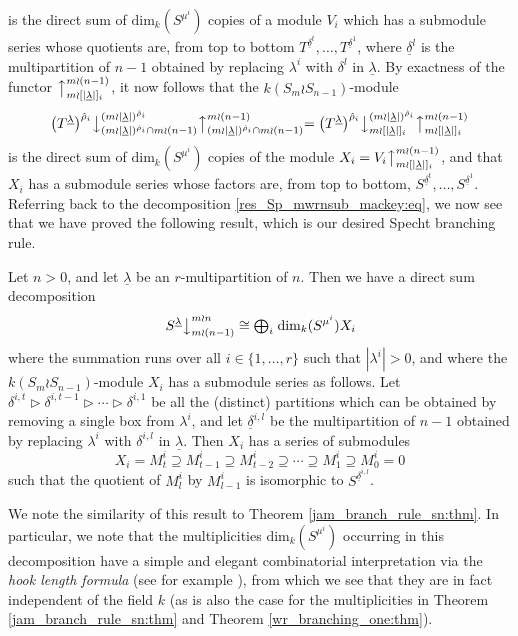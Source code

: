 \documentclass[ALCO,Unicode,published]{cedram}
\newcommand{\ul}[1]{\underline{#1}}
\begin{document}
is the direct sum of $\mathrm{dim}_k(S^{\mu^i})$ copies of a module $V_i$ which has a submodule series whose quotients are, from top to
bottom $T^{\ul{\delta}^t}, \ldots, T^{\ul{\delta}^1}$, where $\ul{\delta}^l$ is the multipartition of $n-1$ obtained by replacing $\lambda^i$
with $\delta^l$ in $\ul{\lambda}$. By exactness of the functor $\bigl\uparrow^{m \wr (n-1)}_{m \wr [|\ul{\lambda}|]_i}$, it now follows that the
$k(S_m \wr S_{n-1})$-module
\[
\bigl(T^{\ul{\lambda}}\bigr)^{\hat\rho_i}\bigl\downarrow^{(m{\wr}|\ul{\lambda}|)^{\hat\rho_i}}_{(m{\wr}|\ul{\lambda}|)^{\hat\rho_i} \cap m \wr (n-1)}
\bigl\uparrow^{m \wr (n-1)}_{(m{\wr}|\ul{\lambda}|)^{\hat\rho_i} \cap m \wr (n-1)}
=
\bigl(T^{\ul{\lambda}}\bigr)^{\hat\rho_i}\bigl\downarrow^{(m{\wr}|\ul{\lambda}|)^{\hat\rho_i}}_{m \wr [|\ul{\lambda}|]_i}
\bigl\uparrow^{m \wr (n-1)}_{m \wr [|\ul{\lambda}|]_i}
\]
is the direct sum of $\mathrm{dim}_k(S^{\mu^i})$ copies of the module $X_i = V_i\bigl\uparrow^{m \wr (n-1)}_{m \wr [|\ul{\lambda}|]_i}$, and that
$X_i$ has a submodule series whose factors are, from top to bottom, $S^{\ul{\delta}^t},\ldots,S^{\ul{\delta}^1}$.
Referring back to the decomposition \eqref{res_Sp_mwrnsub_mackey:eq}, we now see that we have proved the following result, which is our
desired Specht branching rule.

\begin{theo}
Let $n>0$, and let $\ul{\lambda}$ be an $r$-multipartition of $n$. Then we have a direct sum decomposition
\[\left.S^{\ul{\lambda}}\right\downarrow^{m \wr n}_{m \wr (n-1)} \cong {\textstyle \bigoplus_i}\;\mathrm{dim}_k(S^{\mu^i})X_i\]
where the summation runs over all $i \in \{1,\ldots,r\}$ such that $|\lambda^i| > 0$, and where the $k(S_m \wr S_{n-1})$-module $X_i$ has a
submodule series as follows. Let $\delta^{i,t} \triangleright \delta^{i,t-1} \triangleright \cdots \triangleright \delta^{i,1}$ be all the
(distinct) partitions which can be obtained by removing a single box from $\lambda^i$, and let $\ul{\delta}^{i,l}$ be the multipartition
of $n-1$ obtained by replacing $\lambda^i$ with $\delta^{i,l}$ in $\ul{\lambda}$. Then $X_i$ has a series of submodules
\[ X_i  = M^i_t \supseteq M^i_{t-1} \supseteq M^i_{t-2} \supseteq \cdots \supseteq M^i_1 \supseteq M^i_0 = 0 \]
such that the quotient of $M^i_l$ by $M^i_{l-1}$ is isomorphic to $S^{\ul{\delta}^{i,l}}$.
\end{theo}

We note the similarity of this result to Theorem \ref{jam_branch_rule_sn:thm}. In particular, we note that the multiplicities
$\mathrm{dim}_k(S^{\mu^i})$ occurring in this decomposition have a simple and elegant combinatorial interpretation via the
\textit{hook length formula} (see for example \cite[Chapter 20]{JAMSN}), from which we see that they are in fact independent of the field
$k$ (as is also the case for the multiplicities in Theorem \ref{jam_branch_rule_sn:thm} and Theorem \ref{wr_branching_one:thm}).



%

\end{document}
